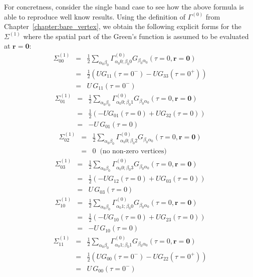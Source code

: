 For concretness, consider the single band case to see how the above formula
is able to reproduce well know results.
Using the definition of $\Gamma^{(0)}$ from Chapter~\ref{chapter:bare_vertex},
we obtain the following explicit forms for the $\Sigma^{(1)}$
where the spatial part of the Green's function is assumed to
be evaluated at $\mathbf{r} = \mathbf{0}$:
\begin{eqnarray}
\Sigma^{(1)}_{00} & = &
\frac{1}{2}\sum_{\alpha_0\beta_0} \Gamma^{(0)}_{\alpha_0 0; \beta_0 0}
G_{\beta_0 \alpha_0}(\tau =0, \mathbf{r}=\mathbf{0}) \\
    & = & \frac{1}{2}\left(U G_{11}(\tau = 0^-) - 
        U G_{33}(\tau = 0^+) \right)\\
    & = & U\, G_{11}(\tau = 0^-) 
\end{eqnarray}
\begin{eqnarray}
\Sigma^{(1)}_{01} & = &
\frac{1}{2}\sum_{\alpha_0\beta_0} \Gamma^{(0)}_{\alpha_0 0; \beta_0 1}
G_{\beta_0 \alpha_0}(\tau =0, \mathbf{r}=\mathbf{0}) \\
    & = & \frac{1}{2}\left(-U G_{01}(\tau = 0) + 
U G_{32}(\tau = 0)\right) \\
    & = & -U\, G_{01}(\tau = 0)
\end{eqnarray}
\begin{eqnarray}
\Sigma^{(1)}_{02} & = &
\frac{1}{2}\sum_{\alpha_0\beta_0} \Gamma^{(0)}_{\alpha_0 0; \beta_0 2}
G_{\beta_0 \alpha_0}(\tau =0, \mathbf{r}=\mathbf{0}) \\
    & = & 0  \;\;\textrm{(no non-zero vertices)}
\end{eqnarray}
\begin{eqnarray}
\Sigma^{(1)}_{03} & = &
\frac{1}{2}\sum_{\alpha_0\beta_0} \Gamma^{(0)}_{\alpha_0 0; \beta_0 3}
G_{\beta_0 \alpha_0}(\tau =0, \mathbf{r}=\mathbf{0}) \\
    & = & \frac{1}{2}\left(-U G_{12}(\tau = 0) + U G_{03}(\tau = 0)\right) \\
    & = & U\, G_{03}(\tau = 0) 
\end{eqnarray}
\begin{eqnarray}
\Sigma^{(1)}_{10} & = &
\frac{1}{2}\sum_{\alpha_0\beta_0} \Gamma^{(0)}_{\alpha_0 1; \beta_0 0}
G_{\beta_0 \alpha_0}(\tau =0, \mathbf{r}=\mathbf{0}) \\
    & = & \frac{1}{2}\left(-U G_{10}(\tau = 0) + 
U G_{23}(\tau = 0)\right) \\
    & = & -U\, G_{10}(\tau = 0)
\end{eqnarray}
\begin{eqnarray}
\Sigma^{(1)}_{11} & = &
\frac{1}{2}\sum_{\alpha_0\beta_0} \Gamma^{(0)}_{\alpha_0 1; \beta_0 1}
G_{\beta_0 \alpha_0}(\tau =0, \mathbf{r}=\mathbf{0}) \\
    & = & \frac{1}{2}\left(U G_{00}(\tau = 0^-)  
- U G_{22}(\tau = 0^+)\right) \\
    & = & U\, G_{00}(\tau = 0^-)
\end{eqnarray}
